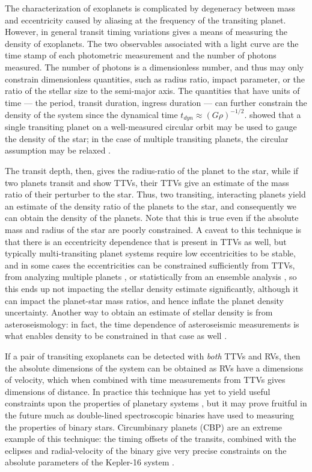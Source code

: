 \documentclass[graybox,natbib,nosecnum]{svmult}
\begin{document}
The characterization of exoplanets is complicated by degeneracy between mass and eccentricity
caused by aliasing at the frequency of the transiting planet.  However,
in general transit timing variations gives a means of measuring the density of exoplanets.
The two observables associated with a light curve are the time stamp of each photometric
measurement and the number of photons measured.  The number of photons is a dimensionless
number, and thus may only constrain dimensionless quantities, such as radius ratio, impact 
parameter, or the ratio of the stellar size to the semi-major axis.  The quantities that 
have units of time --- the period, transit duration, ingress duration ---  can further
constrain the density of the system since the dynamical time $t_{dyn} \approx
(G\rho)^{-1/2}$.  \citet{2003ApJ...585.1038S} showed that a single transiting planet
on a well-measured circular orbit may be used to gauge the density of the star;
in the case of multiple transiting planets, the circular assumption may be relaxed
\citep{2014MNRAS.440.2164K}.

The transit depth, then, gives the radius-ratio of the planet to the star, while if two planets
transit and show TTVs, their TTVs give an estimate of the mass ratio of their perturber
to the star.  Thus, two transiting, interacting planets yield an estimate of the density ratio of
the planets to the star, and consequently we can obtain the density of the planets.
Note that this is true even if the absolute mass and radius of the star are poorly
constrained.  A caveat to this technique is that there is an eccentricity dependence that 
is present in TTVs as well,
but typically multi-transiting planet systems require low eccentricities to be stable,
and in some cases the eccentricities can be constrained sufficiently from TTVs, from
analyzing multiple planets \citep{2014MNRAS.440.2164K}, or
statistically from an ensemble analysis \citep{2014ApJ...787...80H}, so this ends up not impacting the stellar density 
estimate significantly, although it can impact the planet-star mass ratios, and
hence inflate the planet density uncertainty.
Another way to obtain an estimate of stellar density is from asteroseismology:
in fact, the time dependence of asteroseismic measurements is what enables density
to be constrained in that case as well \citep{1986ApJ...306L..37U}.

If a pair of transiting exoplanets can be detected with {\it both} TTVs and RVs, then the
absolute dimensions of the system can be obtained \citep{2005MNRAS.359..567A,
2013ApJ...762..112M} as RVs have a dimensions of velocity, which 
when combined with time measurements from TTVs gives dimensions of distance.
In practice this technique has yet to yield useful constraints upon the properties
of planetary systems \citep{2015MNRAS.453.2644A}, but it may prove fruitful
in the future much as double-lined spectroscopic binaries have used to measuring 
the properties of binary stars.  Circumbinary planets (CBP) are an extreme example
of this technique: the timing offsets of the transits, combined with the eclipses
and radial-velocity of the binary give very precise constraints on the absolute parameters
of the Kepler-16 system \citep{2011Sci...333.1602D}.
\end{document}
